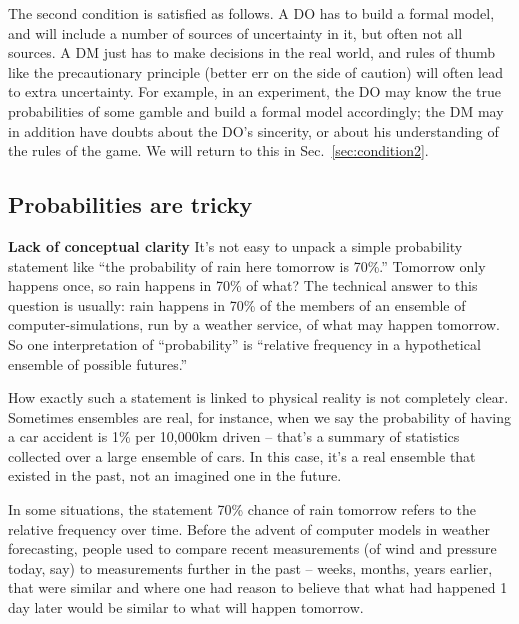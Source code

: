 \documentclass[11pt]{article}
\newcommand{\seclabel}[1]{\label{sec:#1}}
\newcommand{\sref}[1]{Sec.~\ref{sec:#1}}
\newcommand{\eg}{{\it e.g.}\xspace}
\newcommand{\subhead}[1]{\mbox{}\newline\textbf{#1}\newline}
\numberwithin{equation}{section}
\begin{document}
The second condition is satisfied as follows. A DO has to build a formal model, and will include a number of sources of uncertainty in it, but often not all sources. A DM just has to make decisions in the real world, and rules of thumb like the precautionary principle (better err on the side of caution) will often lead to extra uncertainty. For example, in an experiment, the DO may know the true probabilities of some gamble and build a formal model accordingly; the DM may in addition have doubts about the DO's sincerity, or about his understanding of the rules of the game. We will return to this in \sref{condition2}.

\subsection{Probabilities are tricky\seclabel{tricky}}
\subhead{Lack of conceptual clarity}
It's not easy to unpack a simple probability statement like ``the probability of rain here tomorrow is 70\%.'' Tomorrow only happens once, so rain happens in 70\% of what? The technical answer to this question is usually: rain happens in 70\% of the members of an ensemble of computer-simulations, run by a weather service, of what may happen tomorrow. So one interpretation of ``probability'' is ``relative frequency in a hypothetical ensemble of possible futures.'' 

How exactly such a statement is linked to physical reality is not completely clear. Sometimes ensembles are real, for instance, when we say the probability of having a car accident is 1\% per 10,000km driven -- that's a summary of statistics collected over a large ensemble of cars. In this case, it's a real ensemble that existed in the past, not an imagined one in the future. 

In some situations, the statement 70\% chance of rain tomorrow refers to the relative frequency over time. Before the advent of computer models in weather forecasting, people used to compare recent measurements (of wind and pressure today, say) to measurements further in the past -- weeks, months, years earlier, that were similar and where one had reason to believe that what had happened 1 day later would be similar to what will happen tomorrow.
\end{document}
